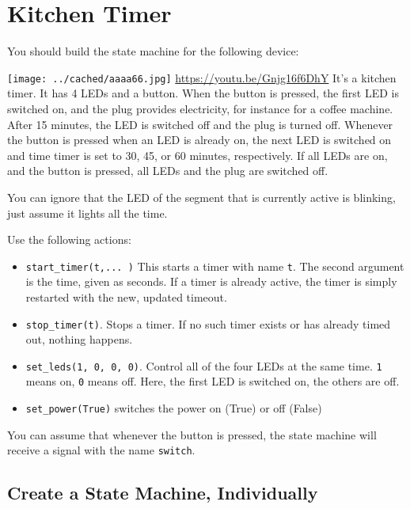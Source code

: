 \documentclass[10pt, twoside, twocolumn]{book}
\providecommand{\tightlist}{%
  \setlength{\itemsep}{0pt}\setlength{\parskip}{0pt}}
\begin{document}
\hypertarget{kitchen-timer}{%
\section{Kitchen Timer}\label{kitchen-timer}}

You should build the state machine for the following device:



\texttt{[image: ../cached/aaaa66.jpg]}
\url{https://youtu.be/Gnjg16f6DhY}
It's a kitchen timer. It has 4 LEDs and a button. When the button is
pressed, the first LED is switched on, and the plug provides
electricity, for instance for a coffee machine. After 15 minutes, the
LED is switched off and the plug is turned off. Whenever the button is
pressed when an LED is already on, the next LED is switched on and time
timer is set to 30, 45, or 60 minutes, respectively. If all LEDs are on,
and the button is pressed, all LEDs and the plug are switched off.

You can ignore that the LED of the segment that is currently active is
blinking, just assume it lights all the time.

Use the following actions:

\begin{itemize}
\tightlist
\item
  \texttt{start\_timer(\textquotesingle{}t\textquotesingle{},...\ )}
  This starts a timer with name \texttt{t}. The second argument is the
  time, given as seconds. If a timer is already active, the timer is
  simply restarted with the new, updated timeout.
\item
  \texttt{stop\_timer(\textquotesingle{}t\textquotesingle{})}. Stops a
  timer. If no such timer exists or has already timed out, nothing
  happens.
\item
  \texttt{set\_leds(1,\ 0,\ 0,\ 0)}. Control all of the four LEDs at the
  same time. \texttt{1} means on, \texttt{0} means off. Here, the first
  LED is switched on, the others are off.
\item
  \texttt{set\_power(True)} switches the power on (True) or off (False)
\end{itemize}

You can assume that whenever the button is pressed, the state machine
will receive a signal with the name \texttt{switch}.

\hypertarget{create-a-state-machine-individually}{%
\subsection{Create a State Machine,
Individually}\label{create-a-state-machine-individually}}
\end{document}
